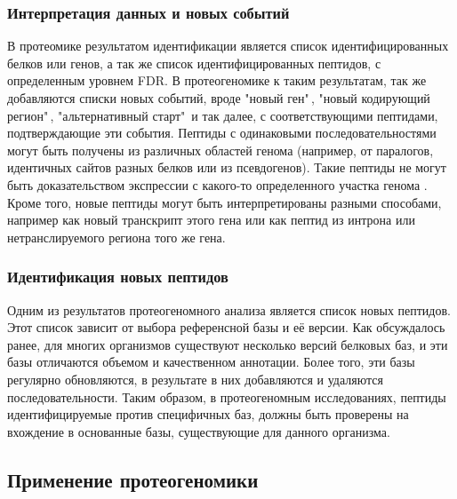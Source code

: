 \subsubsection{Интерпретация данных и новых событий}
В протеомике результатом идентификации является список идентифицированных белков или генов, а так же список идентифицированных пептидов, с определенным уровнем FDR. В протеогеномике к таким результатам, так же добавляются списки новых событий, вроде "новый ген"\,, "новый кодирующий регион"\,, "альтернативный старт"\  и так далее, с соответствующими пептидами, подтверждающие эти события. Пептиды с одинаковыми последовательностями могут быть получены из различных областей генома (например, от паралогов, идентичных сайтов разных белков или из псевдогенов). Такие пептиды не могут быть доказательством экспрессии с какого-то определенного участка генома \cite{nesvizhskii2005interpretation}. Кроме того, новые пептиды могут быть интерпретированы разными способами, например как новый транскрипт этого гена или как пептид из интрона или нетранслируемого региона того же гена. 

\subsubsection{Идентификация новых пептидов}
Одним из результатов протеогеномного анализа является список новых пептидов. Этот список зависит от выбора референсной базы и её версии. Как обсуждалось ранее, для многих организмов существуют несколько версий белковых баз, и эти базы отличаются объемом и качественном аннотации. Более того, эти базы регулярно обновляются, в результате в них добавляются и удаляются последовательности. Таким образом, в протеогеномным исследованиях, пептиды идентифицируемые против специфичных баз, должны быть проверены на вхождение в основанные базы, существующие для данного организма.

\subsection{Применение протеогеномики}

